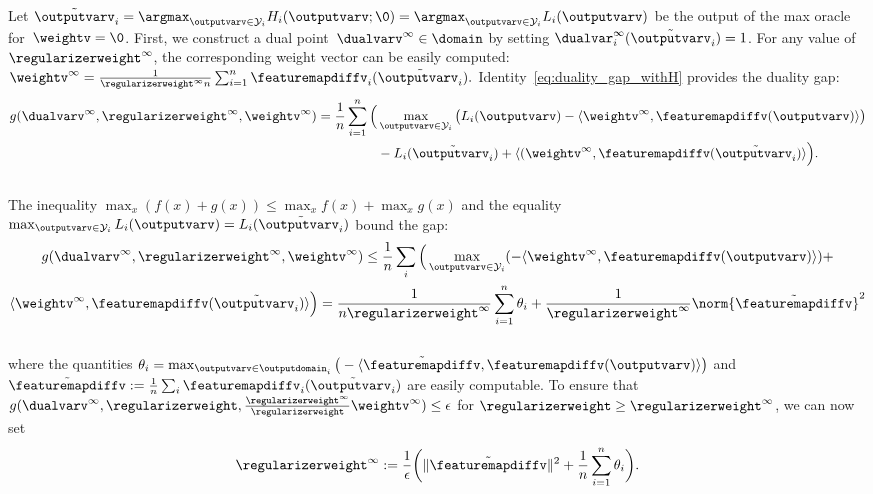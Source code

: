 \documentclass{article}
\begin{document}
Let 
$
\tilde{\outputvarv}_i = \argmax_{\outputvarv \in \mathcal{Y}_i} H_i(\outputvarv; \0) = \argmax_{\outputvarv \in \mathcal{Y}_i} L_i(\outputvarv)
$
be the output of the max oracle for~$\weightv = \0$.
First, we construct a dual point~$\dualvarv^\infty \in \domain$ by setting $\dualvar^\infty_i(\tilde{\outputvarv}_i) = 1$. For any value of~$\regularizerweight^\infty$, the corresponding weight vector can be easily computed:
$
\weightv^\infty =  \frac{1}{\regularizerweight^\infty n} \sum_{i=1}^n \featuremapdiffv_i (\tilde{\outputvarv_i}).
$
Identity~\eqref{eq:duality_gap_withH} provides the duality gap:\\[-5mm]
\begin{align*}
g(\dualvarv^\infty, \regularizerweight^\infty, \weightv^\infty) = \frac1n \sum_{i=1}^{n} \Big( &\max_{\outputvarv \in \mathcal{Y}_i } \big( L_i(\outputvarv) - \langle\weightv^\infty, \featuremapdiffv(\outputvarv) \rangle \big) \nonumber \\
&- L_i(\tilde{\outputvarv_i}) + \langle(\weightv^\infty, \featuremapdiffv(\tilde{\outputvarv_i})\rangle \Big).
\end{align*}\\[-5mm]
The inequality $\max_x( f(x) + g(x) ) \leq \max_x f(x) + \max_x g(x)$ and the equality $ \max_{\outputvarv \in \mathcal{Y}_i } L_i(\outputvarv) =L_i(\tilde{\outputvarv_i})$ bound the gap:\\[-5mm]
\begin{multline}
%
g(\dualvarv^\infty, \regularizerweight^\infty, \weightv^\infty) \leq  \frac1n \sum_i \Big( \max_{\outputvarv \in \mathcal{Y}_i } (- \langle\weightv^\infty, \featuremapdiffv(\outputvarv)\rangle ) +\\  \langle\weightv^\infty, \featuremapdiffv(\tilde{\outputvarv_i})\rangle \Big) \nonumber 
= \frac{1}{n \regularizerweight^\infty} \sum_{i=1}^n \theta_i + \frac{1}{\regularizerweight^\infty} \norm{\tilde{\featuremapdiffv}}^2
\end{multline}\\[-4mm]
where the quantities $\theta_i = \max_{\outputvarv \in \outputdomain_i}  \big( - \langle\tilde{\featuremapdiffv}, \featuremapdiffv(\outputvarv)\rangle \big)$ and $\tilde{\featuremapdiffv} := \frac1n \sum_i \featuremapdiffv_i (\tilde{\outputvarv_i})$ are easily computable. 
To ensure that $g(\dualvarv^\infty, \regularizerweight, \frac{\regularizerweight^\infty}{\regularizerweight}\weightv^\infty) \leq\epsilon$ for $\regularizerweight \geq \regularizerweight^\infty$, we can now set\\[-3mm]
\begin{equation*}
\regularizerweight^\infty := \frac{1}{\epsilon} \bigg(\|\tilde{\featuremapdiffv}\|^2 + \frac1n \sum_{i=1}^n \theta_i \bigg).
\end{equation*}
 
\end{document}
